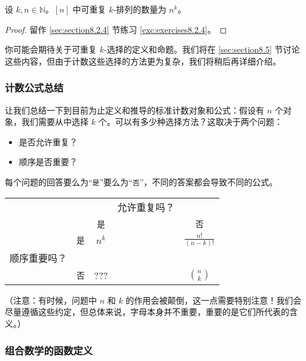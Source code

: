 \begin{proposition}\label{prop:proposition8.2.21}
    设 $k, n \in \mathbb{N}$。$[n]$ 中可重复 $k$-排列的数量为 $n^k$。
\end{proposition}

\begin{proof}
    留作 \ref{sec:section8.2.4} 节练习 \ref{exc:exercises8.2.4}。
\end{proof}

你可能会期待关于可重复 $k$-选择的定义和命题。我们将在 \ref{sec:section8.5} 节讨论这些内容，但由于计数这些选择的方法更为复杂，我们将稍后再详细介绍。

\subsubsection*{计数公式总结}\label{sec:section8.2.3}

让我们总结一下到目前为止定义和推导的标准计数对象和公式：假设有 $n$ 个对象，我们需要从中选择 $k$ 个。可以有多少种选择方法？这取决于两个问题：
\begin{itemize}
    \item 是否允许重复？
    \item 顺序是否重要？
\end{itemize}
每个问题的回答要么为``\verb|是|''要么为``\verb|否|''，不同的答案都会导致不同的公式。
\begin{center}
    \begin{tabular}{lcccc}
               &          &          & 允许重复吗？ &                                       \\
               &          & \verb|是| &        & \verb|否|                              \\
               & \verb|是| & $n^k$    &        & $\displaystyle \frac{n!}{(n-k)!}$     \\
        顺序重要吗？ &          &          &        &                                       \\
               & \verb|否| & ???      &        & ${n \choose k}$
    \end{tabular}
\end{center}
（注意：有时候，问题中 $n$ 和 $k$ 的作用会被颠倒，这一点需要特别注意！我们会尽量遵循这些约定，但总体来说，字母本身并不重要，重要的是它们所代表的含义。）

\subsubsection*{组合数学的函数定义}


